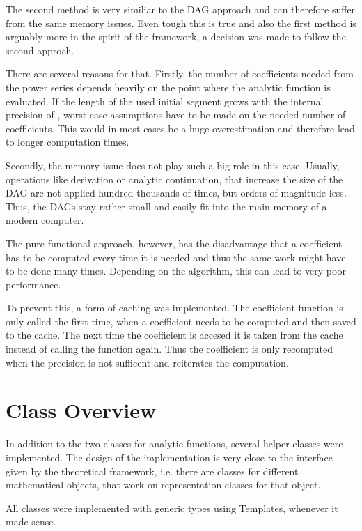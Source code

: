 		The second method is very similiar to the DAG approach and can therefore suffer from the same memory issues.
		Even tough this is true and also the first method is arguably more in the spirit of the \irram framework, a decision was made to follow the second approch.

		There are several reasons for that. Firstly, the number of coefficients needed from the power series depends heavily on the point where the analytic function is evaluated. 
		If the length of the used initial segment grows with the internal precision of \irram, worst case assumptions have to be 
		made on the needed number of coefficients. 
		This would in most cases be a huge overestimation and therefore lead to longer computation times.

		Secondly, the memory issue does not play such a big role in this case. 
		Usually, operations like derivation or analytic continuation, that increase the size of the DAG 
		are not applied hundred thousands of times, but orders of magnitude less. 
		Thus, the DAGs stay rather small and easily fit into the main memory of a modern computer.

		The pure functional approach, however, has the disadvantage that a coefficient has to
		be computed every time it is needed and thus the same work might have to be done many times. 
		Depending on the algorithm, this can lead to very poor performance.

		To prevent this, a form of caching was implemented. The coefficient function is only called the first time, when a 
		coefficient needs to be computed and then saved to the cache. The next time the coefficient is accesed it is taken from 
		the cache instead of calling the function again. 
    Thus the coefficient is only recomputed when the precision is not sufficent and \irram reiterates the computation.



	\section{Class Overview}
		In addition to the two classes for analytic functions, several helper classes were implemented.
    The design of the implementation is very close to the interface given by the theoretical framework, i.e.
    there are classes for different mathematical objects, that work on representation classes for that object.

		All classes were implemented with generic types using Templates, whenever it made sense.

